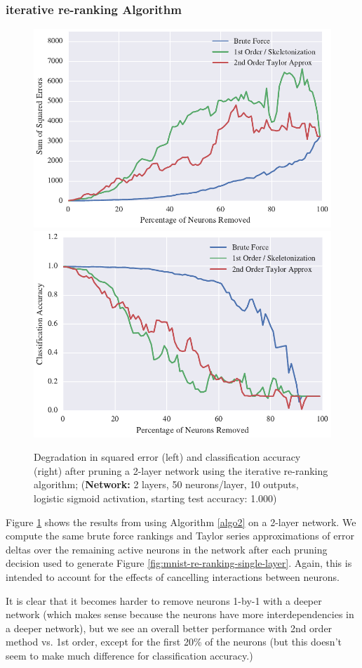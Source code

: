 \subsubsection{iterative re-ranking Algorithm}
\begin{figure}[!ht]
\centering
\includegraphics[width=0.49\linewidth]{png/mnist-deep-iterative-rerank-method.pdf}
\includegraphics[width=0.49\linewidth]{png/mnist-deep-iterative-rerank-accuracy.pdf}
\caption{Degradation in squared error (left) and classification accuracy (right) after pruning a 2-layer network using the iterative re-ranking algorithm; (\textbf{Network:} 2 layers, 50 neurons/layer, 10 outputs, logistic sigmoid activation, starting test accuracy: 1.000)}
\label{fig:mnist-re-ranking-double-layer}
\end{figure}

Figure \ref{fig:mnist-re-ranking-double-layer} shows the results from using Algorithm \ref{algo2} on a 2-layer network. We compute the same brute force rankings and Taylor series approximations of error deltas over the remaining active neurons in the network after each pruning decision used to generate Figure \ref{fig:mnist-re-ranking-single-layer}. Again, this is intended to account for the effects of cancelling interactions between neurons. 

It is clear that it becomes harder to remove neurons 1-by-1 with a deeper network (which makes sense because the neurons have more interdependencies in a deeper network), but we see an overall better performance with 2nd order method vs. 1st order, except for the first 20\% of the neurons (but this doesn't seem to make much difference for classification accuracy.) 

